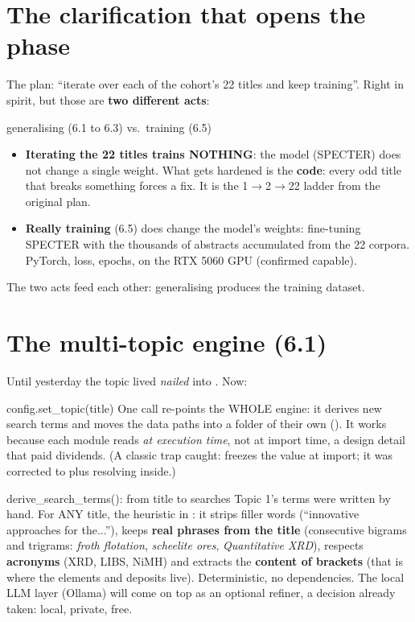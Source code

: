 \documentclass[11pt,a4paper]{article}
\begin{document}

\section{The clarification that opens the phase}

The plan: ``iterate over each of the cohort's 22 titles and keep training''. Right in spirit,
but those are \textbf{two different acts}:

\begin{concepto}{generalising (6.1 to 6.3) vs.\ training (6.5)}
\begin{itemize}
  \item \textbf{Iterating the 22 titles trains NOTHING}: the model (SPECTER) does not change a
        single weight. What gets hardened is the \textbf{code}: every odd title that breaks
        something forces a fix. It is the 1$\rightarrow$2$\rightarrow$22 ladder from the
        original plan.
  \item \textbf{Really training} (6.5) does change the model's weights: fine-tuning SPECTER
        with the thousands of abstracts accumulated from the 22 corpora. PyTorch, loss, epochs,
        on the RTX 5060 GPU (confirmed capable).
\end{itemize}
The two acts feed each other: generalising produces the training dataset.
\end{concepto}

\section{The multi-topic engine (6.1)}

Until yesterday the topic lived \emph{nailed} into . Now:

\begin{concepto}{config.set\_topic(title)}
One call re-points the WHOLE engine: it derives new search terms and moves the data paths into
a folder of their own (). It works because each module reads
 \emph{at execution time}, not at import time, a design detail that paid
dividends. (A classic trap caught:  freezes the value at import;
it was corrected to  plus resolving inside.)
\end{concepto}

\begin{concepto}{derive\_search\_terms(): from title to searches}
Topic 1's terms were written by hand. For ANY title, the heuristic in :
it strips filler words (``innovative approaches for the...''), keeps \textbf{real phrases from
the title} (consecutive bigrams and trigrams: \emph{froth flotation}, \emph{scheelite ores},
\emph{Quantitative XRD}), respects \textbf{acronyms} (XRD, LIBS, NiMH) and extracts the
\textbf{content of brackets} (that is where the elements and deposits live). Deterministic, no
dependencies. The local LLM layer (Ollama) will come on top as an optional refiner, a decision
already taken: local, private, free.
\end{concepto}
\end{document}

